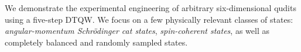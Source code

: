 


We demonstrate the experimental engineering of arbitrary six-dimensional qudits using a five-step \ac{DTQW}. We focus on a few physically relevant classes of states: \emph{angular-momentum Schrödinger cat states}, \emph{spin-coherent states}, as well as completely balanced and randomly sampled states.


